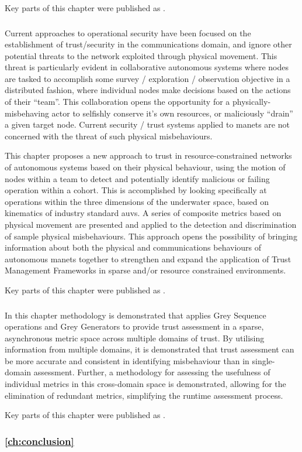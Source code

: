Key parts of this chapter were published as .

\subsubsection{}

Current approaches to operational security have been focused on the establishment of trust/security in the communications domain, and ignore other potential threats to the network exploited through physical movement.
This threat is particularly evident in collaborative autonomous systems where nodes are tasked to accomplish some survey / exploration / observation objective in a distributed fashion, where individual nodes make decisions based on the actions of their ``team''. 
This collaboration opens the opportunity for a physically-misbehaving actor to selfishly conserve it's own resources, or maliciously ``drain'' a given target node.
Current security / trust systems applied to \glspl{manet} are not concerned with the threat of such physical misbehaviours.

This chapter proposes a new approach to trust in resource-constrained networks of autonomous systems based on their physical behaviour, using the motion of nodes within a team to detect and potentially identify malicious or failing operation within a cohort.
This is accomplished by looking specifically at operations within the three dimensions of the underwater space, based on kinematics of industry standard \glspl{auv}.
A series of composite metrics based on physical movement are presented and applied to the detection and discrimination of sample physical misbehaviours.
This approach opens the possibility of bringing information about both the physical and communications behaviours of autonomous \glspl{manet} together to strengthen and expand the application of Trust Management Frameworks in sparse and/or resource constrained environments.

Key parts of this chapter were published as .



\subsubsection{}

In this chapter methodology is demonstrated that applies Grey Sequence operations and Grey Generators to provide trust assessment in a sparse, asynchronous metric space across multiple domains of trust.
By utilising information from multiple domains, it is demonstrated that trust assessment can be more accurate and consistent in identifying misbehaviour than in single-domain assessment.
Further, a methodology for assessing the usefulness of individual metrics in this cross-domain space is demonstrated, allowing for the elimination of redundant metrics, simplifying the runtime assessment process.

Key parts of this chapter were published as .

\subsubsection{\autoref{ch:conclusion}}





